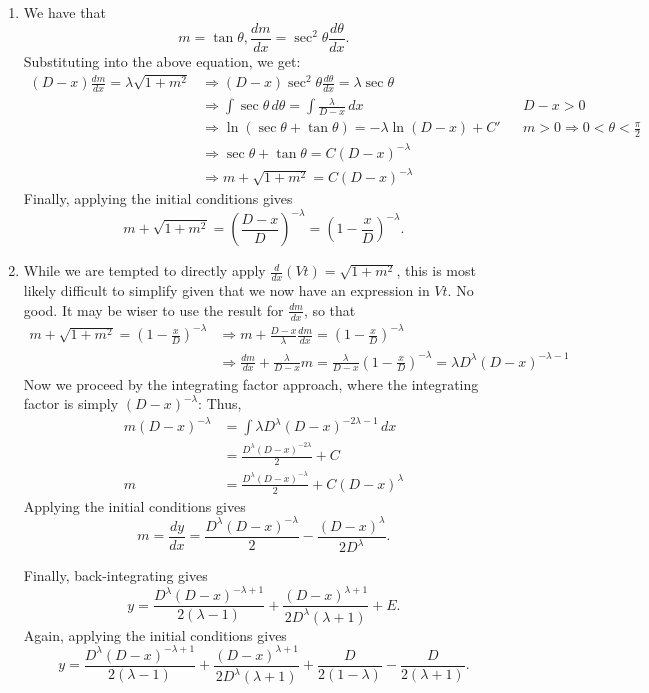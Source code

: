 \documentclass[../main.tex]{subfiles}
\begin{document}
\begin{enumerate}
    \item We have that \[m=\tan{\theta}, \frac{dm}{dx}=\sec^2{\theta}\frac{d\theta}{dx}.\]
Substituting into the above equation, we get:
\begin{align*}
    (D-x)\frac{dm}{dx}=\lambda\sqrt{1+m^2} &\Longrightarrow (D-x)\sec^2{\theta}\frac{d\theta}{dx}=\lambda\sec{\theta} \\
    &\Longrightarrow \int \sec{\theta}\,d\theta = \int \frac{\lambda}{D-x}\,dx && D-x > 0\\
    &\Longrightarrow \ln\left(\sec{\theta}+\tan{\theta}\right)=-\lambda\ln{(D-x)}+C' &&m>0 \Longrightarrow 0 < \theta < \frac{\pi}{2}\\
    &\Longrightarrow \sec{\theta}+\tan{\theta}=C(D-x)^{-\lambda} \\
    &\Longrightarrow m+\sqrt{1+m^2}=C(D-x)^{-\lambda}
\end{align*}
Finally, applying the initial conditions gives
$$m+\sqrt{1+m^2}=\left(\frac{D-x}{D}\right)^{-\lambda}=\left(1-\frac{x}{D}\right)^{-\lambda}.$$
\item While we are tempted to directly apply $\frac{d}{dx}(Vt)=\sqrt{1+m^2}$, this is most likely difficult to simplify given that we now have an expression in $Vt$. No good. It may be wiser to use the result for $\frac{dm}{dx}$, so that
\begin{align*}
    m+\sqrt{1+m^2}=\left(1-\frac{x}{D}\right)^{-\lambda} &\Longrightarrow m+\frac{D-x}{\lambda}\frac{dm}{dx}=\left(1-\frac{x}{D}\right)^{-\lambda}\\
    &\Longrightarrow \frac{dm}{dx}+\frac{\lambda}{D-x}m=\frac{\lambda}{D-x}\left(1-\frac{x}{D}\right)^{-\lambda}=\lambda D^{\lambda}(D-x)^{-\lambda-1}
\end{align*}
Now we proceed by the integrating factor approach, where the integrating factor is simply $(D-x)^{-\lambda}$:
Thus,
\begin{align*}
    m(D-x)^{-\lambda}&=\int \lambda D^{\lambda}(D-x)^{-2\lambda-1} \,dx \\
    &= \frac{D^{\lambda}(D-x)^{-2\lambda}}{2}+C \\
    m &= \frac{D^{\lambda}(D-x)^{-\lambda}}{2}+C(D-x)^{\lambda}
\end{align*}
Applying the initial conditions gives $$m=\frac{dy}{dx}=\frac{D^{\lambda}(D-x)^{-\lambda}}{2}-\frac{(D-x)^{\lambda}}{2D^{\lambda}}.$$

Finally, back-integrating gives $$y=\frac{D^{\lambda}(D-x)^{-\lambda+1}}{2(\lambda-1)}+\frac{(D-x)^{\lambda+1}}{2D^{\lambda}(\lambda+1)}+E.$$
Again, applying the initial conditions gives 
$$y=\frac{D^{\lambda}(D-x)^{-\lambda+1}}{2(\lambda-1)}+\frac{(D-x)^{\lambda+1}}{2D^{\lambda}(\lambda+1)}+\frac{D}{2(1-\lambda)}-\frac{D}{2(\lambda+1)}.$$


\end{enumerate}
\end{document}
